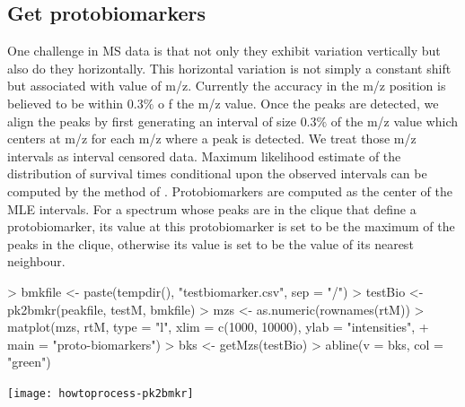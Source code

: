 \documentclass[12pt]{article}
\begin{document}
\subsection{Get protobiomarkers}
One challenge in MS data is that not only they exhibit
variation vertically but also do they horizontally. This
horizontal variation is not simply a constant shift but
associated with value of m/z. Currently the 
accuracy in the m/z position is believed to be within $0.3\%$ o
f the m/z value. Once the peaks are detected, we align the
peaks by first generating an interval of size $0.3\%$ of 
the m/z value which centers at m/z for each m/z where a peak is 
detected. We treat those m/z
intervals as interval censored data. Maximum likelihood 
estimate
of the distribution of survival times conditional upon the 
observed intervals  can be computed by the method of
\cite{Gent:Geye:1994}. Protobiomarkers are computed as 
the center
of the MLE intervals. For a spectrum whose peaks are in the
clique that define a protobiomarker, its value at this 
protobiomarker
is set to be the maximum of the peaks in the clique, otherwise
its value is set to be the value of its nearest neighbour.


\begin{Schunk}
\begin{Sinput}
> bmkfile <- paste(tempdir(), "testbiomarker.csv", sep = "/")
> testBio <- pk2bmkr(peakfile, testM, bmkfile)
> mzs <- as.numeric(rownames(rtM))
> matplot(mzs, rtM, type = "l", xlim = c(1000, 10000), ylab = "intensities", 
+     main = "proto-biomarkers")
> bks <- getMzs(testBio)
> abline(v = bks, col = "green")
\end{Sinput}
\end{Schunk}
\texttt{[image: howtoprocess-pk2bmkr]}

\end{document}
